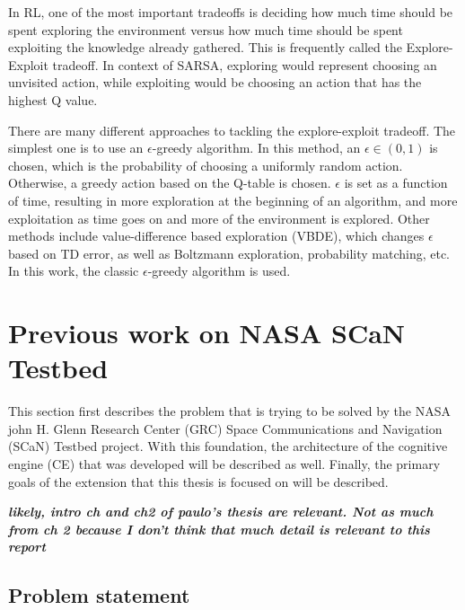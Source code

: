 \documentclass[11pt]{report}
\begin{document}
	\par In RL, one of the most important tradeoffs is deciding how much time should be spent exploring the environment versus how much time should be spent exploiting the knowledge already gathered. This is frequently called the Explore-Exploit tradeoff. In context of SARSA, exploring would represent choosing an unvisited action, while exploiting would be choosing an action that has the highest Q value. 
	\par There are many different approaches to tackling the explore-exploit tradeoff. The simplest one is to use an $\epsilon$-greedy algorithm. In this method, an $\epsilon \in (0,1)$ is chosen, which is the probability of choosing a uniformly random action. Otherwise, a greedy action based on the Q-table is chosen. $\epsilon$ is set as a function of time, resulting in more exploration at the beginning of an algorithm, and more exploitation as time goes on and more of the environment is explored. Other methods include value-difference based exploration (VBDE), which changes $\epsilon$ based on TD error, as well as Boltzmann exploration, probability matching, etc. In this work, the classic $\epsilon$-greedy algorithm is used. 
	
	\section{Previous work on NASA SCaN Testbed}
	\par This section first describes the problem that is trying to be solved by the NASA john H. Glenn Research Center (GRC) Space Communications and Navigation (SCaN) Testbed project. With this foundation, the architecture of the cognitive engine (CE) that was developed will be described as well. Finally, the primary goals of the extension that this thesis is focused on will be described.
	
	\textbf{\textit{likely, intro ch and ch2 of paulo's thesis are relevant. Not as much from ch 2 because I don't think that much detail is relevant to this report}}
	\subsection{Problem statement}
	
\end{document}
